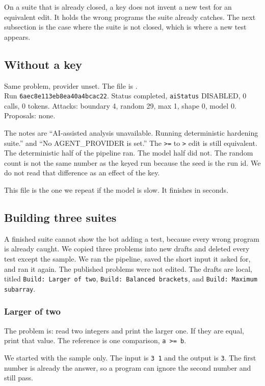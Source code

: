 \documentclass[11pt,a4paper]{article}
\begin{document}
On a suite that is already closed, a key does not invent a new test for an equivalent edit. It holds the wrong programs the suite already catches. The next subsection is the case where the suite is not closed, which is where a new test appears.

\subsection{Without a key}

Same problem, provider unset. The file is .\\
Run \texttt{6aec8e113eb8ea40a4bcac22}. Status completed, \texttt{aiStatus} DISABLED, 0 calls, 0 tokens. Attacks: boundary 4, random 29, max 1, shape 0, model 0. Proposals: none.

The notes are ``AI-assisted analysis unavailable. Running deterministic hardening suite.'' and ``No AGENT\_PROVIDER is set.'' The \texttt{>=} to \texttt{>} edit is still equivalent. The deterministic half of the pipeline ran. The model half did not. The random count is not the same number as the keyed run because the seed is the run id. We do not read that difference as an effect of the key.

This file is the one we repeat if the model is slow. It finishes in seconds.

\subsection{Building three suites}

A finished suite cannot show the bot adding a test, because every wrong program is already caught. We copied three problems into new drafts and deleted every test except the sample. We ran the pipeline, saved the short input it asked for, and ran it again. The published problems were not edited. The drafts are local, titled \texttt{Build: Larger of two}, \texttt{Build: Balanced brackets}, and \texttt{Build: Maximum subarray}.

\subsubsection{Larger of two}

The problem is: read two integers and print the larger one. If they are equal, print that value. The reference is one comparison, \texttt{a >= b}.

We started with the sample only. The input is \texttt{3 1} and the output is \texttt{3}. The first number is already the answer, so a program can ignore the second number and still pass.
\end{document}
